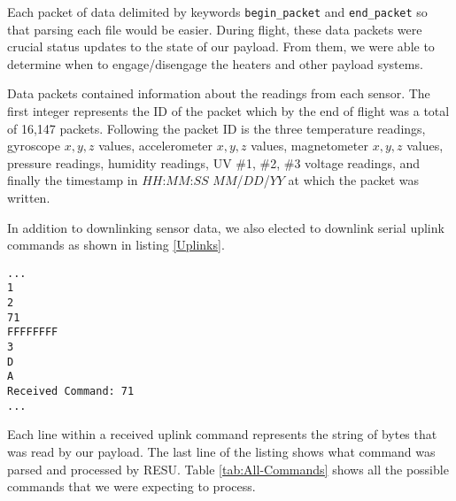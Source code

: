 Each packet of data delimited by keywords \verb|begin_packet| and \verb|end_packet| so that parsing each file would be easier.  During flight, these data packets were crucial status updates to the state of our payload.  From them, we were able to determine when to engage/disengage the heaters and other payload systems.

Data packets contained information about the readings from each sensor.  The first integer represents the ID of the packet which by the end of flight was a total of 16,147 packets.  Following the packet ID is the three temperature readings, gyroscope $x, y, z$ values, accelerometer $x, y, z$ values, magnetometer $x, y, z$ values, pressure readings, humidity readings, UV \#1, \#2, \#3 voltage readings, and finally the timestamp in $HH$:$MM$:$SS$ $MM$/$DD$/$YY$ at which the packet was written.  

In addition to downlinking sensor data, we also elected to downlink serial uplink commands as shown in listing \ref{Uplinks}.  

\lstset{basicstyle=\small, numbers=left, frame=tb, linewidth=11.5cm, xleftmargin=.4\textwidth, label = Uplinks}
\begin{lstlisting}[caption = Sample of received uplink commands in downlinked packets]
...
1
2
71
FFFFFFFF
3
D
A
Received Command: 71
...
\end{lstlisting}
\medskip

Each line within a received uplink command represents the string of bytes that was read by our payload.  The last line of the listing shows what command was parsed and processed by RESU.  Table \ref{tab:All-Commands} shows all the possible commands that we were expecting to process. 
